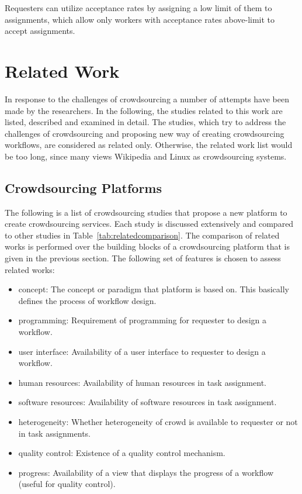 Requesters can utilize acceptance rates by assigning a low limit of them to 
assignments, which allow only workers with acceptance rates above-limit 
to accept assignments.



\section{Related Work}
In response to the challenges of crowdsourcing a number of attempts have been made 
by the researchers. In the following, the studies related to this work are listed, 
described and examined in detail. The studies, which try to address the challenges of 
crowdsourcing and proposing new way of creating crowdsourcing workflows, are
considered as related only. Otherwise, the related work list would be too long, 
since many views Wikipedia and Linux as crowdsourcing systems.


\subsection{Crowdsourcing Platforms}
The following is a list of crowdsourcing studies that propose a new platform 
to create crowdsourcing services. Each study is discussed extensively 
and compared to other studies in Table~\ref{tab:relatedcomparison}. 
The comparison of related works is performed over the building blocks of 
a crowdsourcing platform that is given in the previous section. The following 
set of features is chosen to assess related works:
\begin{itemize}
	\item concept: The concept or paradigm that platform is based on. This 
	basically defines the process of workflow design.
	\item programming: Requirement of programming for requester to design a workflow.
	\item user interface: Availability of a user interface to requester to design a workflow. 
	\item human resources: Availability of human resources in task assignment.
	\item software resources: Availability of software resources in task assignment.
	\item heterogeneity: Whether heterogeneity of crowd is available to requester or not
	in task assignments.
	\item quality control: Existence of a quality control mechanism.
	\item progress: Availability of a view that displays the progress of a workflow (useful
	for quality control).
\end{itemize}

